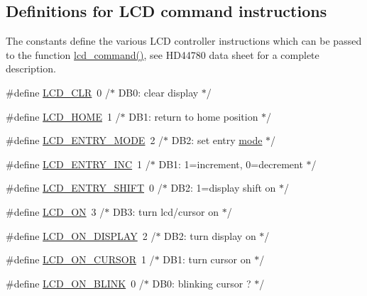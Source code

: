 \subsection*{Definitions for L\+CD command instructions}
\label{_amgrpe1b1604cb195ab970ebf8b6b8b3e322f}%
The constants define the various L\+CD controller instructions which can be passed to the function \mbox{\hyperlink{group__pfleury__lcd_gaea9d14f02df06f948cb5a56776980826}{lcd\+\_\+command()}}, see H\+D44780 data sheet for a complete description. \begin{DoxyCompactItemize}
\item 
\#define \mbox{\hyperlink{group__pfleury__lcd_ga459688213267d13ccfbeb2c9004988cb}{L\+C\+D\+\_\+\+C\+LR}}~0      /$\ast$ D\+B0\+: clear display                  $\ast$/
\item 
\#define \mbox{\hyperlink{group__pfleury__lcd_gae0e309ccad89222eb3457f2da9f2bb8d}{L\+C\+D\+\_\+\+H\+O\+ME}}~1      /$\ast$ D\+B1\+: return to home position        $\ast$/
\item 
\#define \mbox{\hyperlink{group__pfleury__lcd_gae5d757ddb6d94de8c82191b60b40e442}{L\+C\+D\+\_\+\+E\+N\+T\+R\+Y\+\_\+\+M\+O\+DE}}~2      /$\ast$ D\+B2\+: set entry \mbox{\hyperlink{main_8c_a000e34997df38c2005a83d63e67d9282}{mode}}                 $\ast$/
\item 
\#define \mbox{\hyperlink{group__pfleury__lcd_gada766266a0be0d0040fbf86e23b58aa6}{L\+C\+D\+\_\+\+E\+N\+T\+R\+Y\+\_\+\+I\+NC}}~1      /$\ast$   D\+B1\+: 1=increment, 0=decrement     $\ast$/
\item 
\#define \mbox{\hyperlink{group__pfleury__lcd_ga14d0c7fda147e0dc8cdaa4a2629b3532}{L\+C\+D\+\_\+\+E\+N\+T\+R\+Y\+\_\+\+S\+H\+I\+FT}}~0      /$\ast$   D\+B2\+: 1=display shift on           $\ast$/
\item 
\#define \mbox{\hyperlink{group__pfleury__lcd_ga47a809dfec086fdeca93dedc4fb83b44}{L\+C\+D\+\_\+\+ON}}~3      /$\ast$ D\+B3\+: turn lcd/cursor on             $\ast$/
\item 
\#define \mbox{\hyperlink{group__pfleury__lcd_gae84f634b0a1661c4d5bbaafd9397732a}{L\+C\+D\+\_\+\+O\+N\+\_\+\+D\+I\+S\+P\+L\+AY}}~2      /$\ast$   D\+B2\+: turn display on              $\ast$/
\item 
\#define \mbox{\hyperlink{group__pfleury__lcd_ga47638b5ebbaec9600a0ebf9a55caf802}{L\+C\+D\+\_\+\+O\+N\+\_\+\+C\+U\+R\+S\+OR}}~1      /$\ast$   D\+B1\+: turn cursor on               $\ast$/
\item 
\#define \mbox{\hyperlink{group__pfleury__lcd_ga5d76592a978537acee615098ce4d80f5}{L\+C\+D\+\_\+\+O\+N\+\_\+\+B\+L\+I\+NK}}~0      /$\ast$     D\+B0\+: blinking cursor ?          $\ast$/

\end{DoxyCompactItemize}
